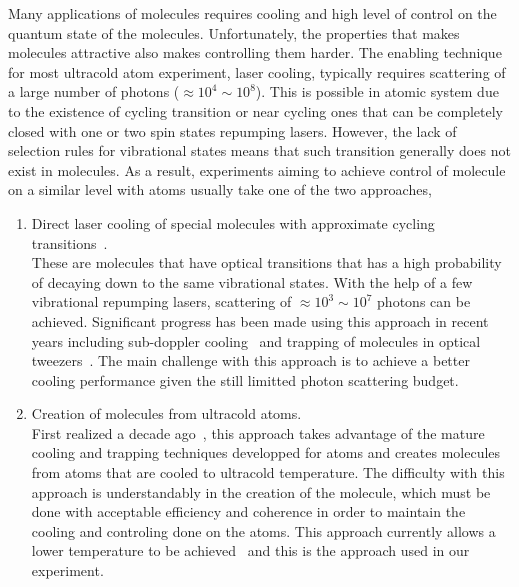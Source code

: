 Many applications of molecules requires cooling and high level of control
on the quantum state of the molecules.
Unfortunately, the properties that makes molecules attractive
also makes controlling them harder.
The enabling technique for most ultracold atom experiment, laser cooling,
typically requires scattering of a large number of photons ($\approx10^4\sim10^8$).
This is possible in atomic system due to the existence of cycling transition
or near cycling ones that can be completely closed with
one or two spin states repumping lasers.
However, the lack of selection rules for vibrational states means that
such transition generally does not exist in molecules.
As a result, experiments aiming to achieve control of molecule on a similar level with atoms
usually take one of the two approaches,
\begin{enumerate}
\item Direct laser cooling of special molecules
  with approximate cycling transitions~\cite{norrgard_submillikelvin_2016,
    anderegg_laser_2018,mitra_direct_2020,ding_sub-doppler_2020,
    mccarron_magnetic_2018,truppe_molecules_2017}.\\
  These are molecules that have optical transitions that has a high probability
  of decaying down to the same vibrational states.
  With the help of a few vibrational repumping lasers,
  scattering of $\approx10^3\sim10^7$ photons can be achieved.
  Significant progress has been made using this approach in recent years
  including sub-doppler cooling~\cite{cheuk_mathrmlambda-enhanced_2018}
  and trapping of molecules in optical tweezers~\cite{anderegg_optical_2019}.
  The main challenge with this approach is to achieve a better cooling performance
  given the still limitted photon scattering budget.
\item Creation of molecules from ultracold atoms.\\
  First realized a decade ago~\cite{ni_high_2008,lang_ultracold_2008},
  this approach takes advantage of the mature cooling and trapping techniques
  developped for atoms and creates molecules from atoms
  that are cooled to ultracold temperature.
  The difficulty with this approach is understandably in the creation of the molecule,
  which must be done with acceptable efficiency and coherence
  in order to maintain the cooling and controling done on the atoms.
  This approach currently allows a lower temperature to be achieved~\cite{
    marco_degenerate_2019,zhang_forming_2020,he_coherently_2020}
  and this is the approach used in our experiment.
\end{enumerate}

